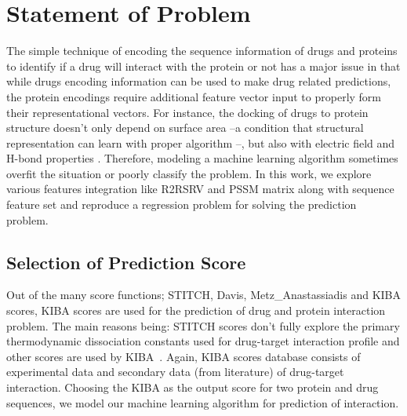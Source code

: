 \iffalse

For citations, use the function \textbackslash cite. \cite{gowar1989power} The references file is the sample.bib one. Google Scholar provides almost all the references in LaTeX form.

To insert a footnote, use the following command. \footnote{This is a footnote.} When necessary to use a nomenclature, define it on the same page for a better organization. Don't create NSN (Non-sense nomenclatures).

For figures, tables, equations and further information, open the file "tips.tex". If what you need is not found there, Google it.

\fi
 
\section{Statement of Problem}
The simple technique of encoding the sequence information of drugs and proteins to identify if a drug will interact with the protein or not has a major issue in that while drugs encoding information can be used to make drug related predictions, the protein encodings require additional feature vector input to properly form their representational vectors. For instance, the docking of drugs to protein structure doesn't only depend on surface area --a condition that structural representation can learn with proper algorithm --, but also with electric field and H-bond properties \cite{Wong2018}. Therefore, modeling a machine learning algorithm sometimes overfit the situation or poorly classify the problem. In this work, we explore various features integration like R2RSRV and PSSM matrix along with sequence feature set and reproduce a regression problem for solving the prediction problem.

\subsection{Selection of Prediction Score}

Out of the many score functions; STITCH, Davis, Metz\_Anastassiadis and KIBA scores, KIBA scores are used for the prediction of drug and protein interaction problem. The main reasons being: STITCH scores don't fully explore the primary thermodynamic dissociation constants used for drug-target interaction profile and other scores are used by KIBA~\cite{Tang2013}.  Again, KIBA scores database consists of experimental data and secondary data (from literature) of drug-target interaction. Choosing the KIBA as the output score for two protein and drug sequences, we model our machine learning algorithm for prediction of interaction.

